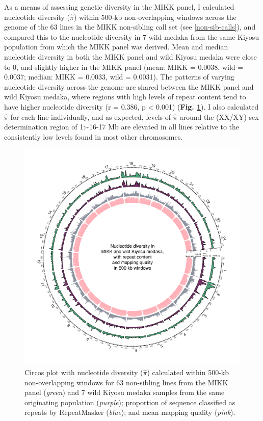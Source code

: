 \documentclass[
]{book}
\begin{document}
As a means of assessing genetic diversity in the MIKK panel, I calculated nucleotide diversity (\(\hat{\pi}\)) within 500-kb non-overlapping windows across the genome of the 63 lines in the MIKK non-sibling call set (see \ref{non-sib-calls}), and compared this to the nucleotide diversity in 7 wild medaka from the same Kiyosu population from which the MIKK panel was derived. Mean and median nucleotide diversity in both the MIKK panel and wild Kiyosu medaka were close to 0, and slightly higher in the MIKK panel (mean: MIKK = 0.0038, wild = 0.0037; median: MIKK = 0.0033, wild = 0.0031). The patterns of varying nucleotide diversity across the genome are shared between the MIKK panel and wild Kiyosu medaka, where regions with high levels of repeat content tend to have higher nucleotide diversity (r = 0.386, p \textless{} 0.001) (\textbf{Fig. \ref{fig:NucleotideDiversity}}). I also calculated \(\hat{\pi}\) for each line individually, and as expected, levels of \(\hat{\pi}\) around the (XX/XY) sex determination region of 1:\textasciitilde16-17 Mb are elevated in all lines relative to the consistently low levels found in most other chromosomes.



\begin{figure}
\includegraphics[width=1\linewidth]{figs/mikk_genome/supp_01_pi_circos} \caption{Circos plot with nucleotide diversity (\(\hat{\pi}\)) calculated within 500-kb non-overlapping windows for 63 non-sibling lines from the MIKK panel (\emph{green}) and 7 wild Kiyosu medaka samples from the same originating population (\emph{purple}); proportion of sequence classified as repeats by RepeatMasker (\emph{blue}); and mean mapping quality (\emph{pink}).}\label{fig:NucleotideDiversity}
\end{figure}
\end{document}
